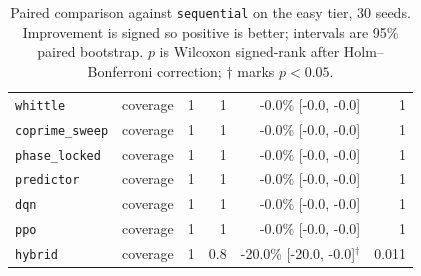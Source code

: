 \begin{table}[t]
\begin{tabular}{llrrrr}
    \texttt{whittle} & coverage & 1 & 1 & -0.0\% [-0.0, -0.0] & 1 \\
    \texttt{coprime\_sweep} & coverage & 1 & 1 & -0.0\% [-0.0, -0.0] & 1 \\
    \texttt{phase\_locked} & coverage & 1 & 1 & -0.0\% [-0.0, -0.0] & 1 \\
    \texttt{predictor} & coverage & 1 & 1 & -0.0\% [-0.0, -0.0] & 1 \\
    \texttt{dqn} & coverage & 1 & 1 & -0.0\% [-0.0, -0.0] & 1 \\
    \texttt{ppo} & coverage & 1 & 1 & -0.0\% [-0.0, -0.0] & 1 \\
    \texttt{hybrid} & coverage & 1 & 0.8 & -20.0\% [-20.0, -0.0]$^{\dagger}$ & 0.011 \\
    \bottomrule
  \end{tabular}
  \caption{Paired comparison against \texttt{sequential} on the easy tier, 30 seeds. Improvement is signed so positive is better; intervals are 95\% paired bootstrap. $p$ is Wilcoxon signed-rank after Holm--Bonferroni correction; $\dagger$ marks $p < 0.05$.}
  \label{tab:leaderboard-easy}
\end{table}

